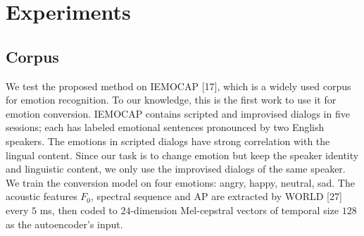 \documentclass{article}
\begin{document}





\section{Experiments}
\label{sec:exp}

\subsection{Corpus}
We test the proposed method on IEMOCAP [17], which is a widely used corpus for emotion recognition. To our knowledge, this is the first work to use it for emotion conversion. IEMOCAP contains scripted and improvised
dialogs in five sessions; each has labeled emotional sentences pronounced by two English speakers. The emotions in scripted dialogs have strong correlation with the lingual content. Since our task is to change emotion but keep the speaker identity and linguistic content, we only use the improvised dialogs of the same speaker. We train the conversion model on four emotions: angry, happy, neutral, sad. The acoustic features $F_0$, spectral sequence and AP are extracted by WORLD [27] every $5$ ms, then coded to $24$-dimension Mel-cepstral vectors of temporal size $128$ as the autoencoder's input.

\end{document}
